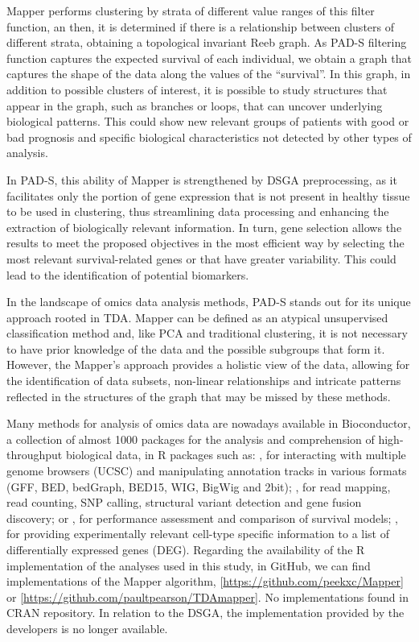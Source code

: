 Mapper performs clustering by strata of different value ranges of this filter function, an then, it is determined if there is a relationship between clusters of different strata, obtaining a topological invariant Reeb graph. As PAD-S filtering function captures the expected survival of each individual, we obtain a graph that captures the shape of the data along the values of the ``survival''. In this graph, in addition to possible clusters of interest, it is possible to study structures that appear in the graph, such as branches or loops, that can uncover underlying biological patterns. This could show new relevant groups of patients with good or bad prognosis and specific biological characteristics not detected by other types of analysis.

In PAD-S, this ability of Mapper is strengthened by DSGA preprocessing, as it facilitates only the portion of gene expression that is not present in healthy tissue to be used in clustering, thus streamlining data processing and enhancing the extraction of biologically relevant information. In turn, gene selection allows the results to meet the proposed objectives in the most efficient way by selecting the most relevant survival-related genes or that have greater variability. This could lead to the identification of potential biomarkers.

In the landscape of omics data analysis methods, PAD-S stands out for its unique approach rooted in TDA. Mapper can be defined as an atypical unsupervised classification method and, like PCA and traditional clustering, it is not necessary to have prior knowledge of the data and the possible subgroups that form it. However, the Mapper's approach provides a holistic view of the data, allowing for the identification of data subsets, non-linear relationships and intricate patterns reflected in the structures of the graph that may be missed by these methods.

Many methods for analysis of omics data are nowadays available in Bioconductor, a collection of almost 1000 packages for the analysis and comprehension of high-throughput biological data, in R packages such as:  \citep{lawrence2009rtracklayer}, for interacting with multiple genome browsers (UCSC) and manipulating annotation tracks in various formats (GFF, BED, bedGraph, BED15, WIG, BigWig and 2bit);  \citep{liao2019r}, for read mapping, read counting, SNP calling, structural variant detection and gene fusion discovery; or  \citep{schroder2011survcomp}, for performance assessment and comparison of survival models;  \citep{sokolowski2021single}, for providing experimentally relevant cell-type specific information to a list of differentially expressed genes (DEG). Regarding the availability of the R implementation of the analyses used in this study, in GitHub, we can find implementations of the Mapper algorithm,  {[}\url{https://github.com/peekxc/Mapper}{]} or  {[}\url{https://github.com/paultpearson/TDAmapper}{]}. No implementations found in CRAN repository. In relation to the DSGA, the implementation provided by the developers is no longer available.

